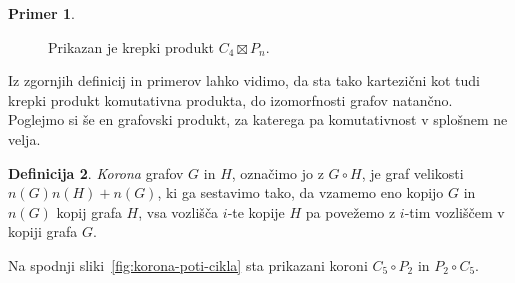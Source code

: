 \documentclass[12pt,a4paper,twoside]{article}
\theoremstyle{definition} %
\newtheorem{definicija}{Definicija}[section]
\newtheorem{primer}[definicija]{Primer}
\theoremstyle{plain} %
\numberwithin{equation}{section}  %
\begin{document}
\begin{primer}
\begin{figure}[h]
        \caption{Prikazan je krepki produkt $C_4 \boxtimes P_n$.}
        \label{fig:krep-produkt-cikel-pot}
    \end{figure}
\end{primer}

Iz zgornjih definicij in primerov lahko vidimo, da sta tako kartezični kot tudi krepki produkt komutativna produkta, do izomorfnosti grafov natančno. Poglejmo si še en grafovski produkt, za katerega pa komutativnost v splošnem ne velja.

\begin{definicija}
    \emph{Korona} grafov $G$ in $H$, označimo jo z $G \circ H$, je graf velikosti $n(G) n(H) + n(G)$, ki ga sestavimo tako, da vzamemo eno kopijo $G$ in $n(G)$ kopij grafa $H$, vsa vozlišča $i$-te kopije $H$ pa povežemo z $i$-tim vozliščem v kopiji grafa $G$.
\end{definicija}
Na spodnji sliki~\ref{fig:korona-poti-cikla} sta prikazani koroni $C_5 \circ P_2$ in $P_2 \circ C_5$.
\end{document}
